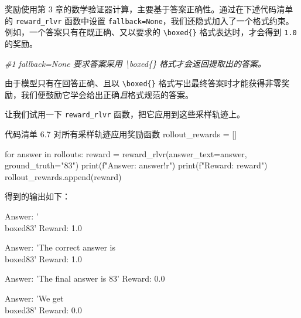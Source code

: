 
奖励使用第 3 章的数学验证器计算，主要基于答案正确性。通过在下述代码清单的 \texttt{reward\_rlvr} 函数中设置 \texttt{fallback=None}，我们还隐式加入了一个格式约束。例如，一个答案只有在既正确、又以要求的 \texttt{\textbackslash boxed\{\}} 格式表达时，才会得到 \texttt{1.0} 的奖励。

{\noindent\small\textit{\#1 fallback=None 要求答案采用 \newline \textbackslash boxed\{\} 格式才会返回提取出的答案。}\par}

由于模型只有在回答正确、且以 \texttt{\textbackslash boxed\{\}} 格式写出最终答案时才能获得非零奖励，我们便鼓励它学会给出正确\emph{且}格式规范的答案。

让我们试用一下 \texttt{reward\_rlvr} 函数，把它应用到这些采样轨迹上。

\begin{codeboxt}{代码清单 6.7 对所有采样轨迹应用奖励函数}
rollout_rewards = []

for answer in rollouts:
    reward = reward_rlvr(answer_text=answer, ground_truth="83")
    print(f"Answer: {answer!r}")
    print(f"Reward: {reward}\n")
    rollout_rewards.append(reward)
\end{codeboxt}

得到的输出如下：

\begin{codebox}
Answer: '\\boxed{83}'
Reward: 1.0

Answer: 'The correct answer is \\boxed{83}'
Reward: 1.0

Answer: 'The final answer is 83'
Reward: 0.0

Answer: 'We get \\boxed{38}'
Reward: 0.0
\end{codebox}

